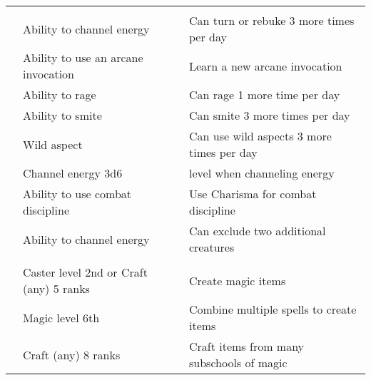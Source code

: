 {\begin{longtabu}{>{\lcol}p{15em} >{\lcol}p{15em} >{\lcol}X}
\midrule
{} &  &  \\
 & Ability to channel energy & Can turn or rebuke 3 more times per day \\
 & Ability to use an arcane invocation & Learn a new arcane invocation \\
 & Ability to rage & Can rage 1 more time per day\\
 & Ability to smite & Can smite 3 more times per day \\
 & Wild aspect & Can use wild aspects 3 more times per day \\
 & Channel energy 3d6 &  level when channeling energy \\
 & Ability to use combat discipline & Use Charisma for combat discipline \\
 & Ability to channel energy & Can exclude two additional creatures \\

\midrule
{} &  &  \\
 & Caster level 2nd or Craft (any) 5 ranks & Create magic items \\
 & Magic level 6th & Combine multiple spells to create items \\
 & Craft (any) 8 ranks & Craft items from many subschools of magic \\


\end{longtabu}}
